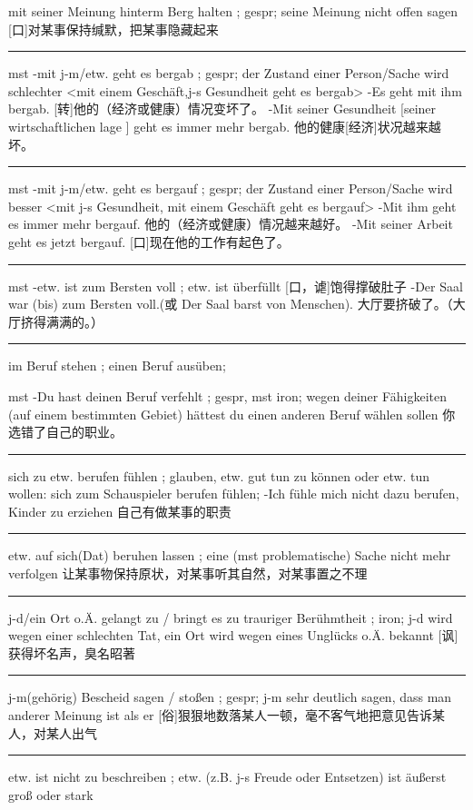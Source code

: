mit seiner Meinung hinterm Berg halten ; gespr; seine Meinung nicht offen sagen
[口]对某事保持缄默，把某事隐藏起来

\noindent\rule{\textwidth}{1pt} 
mst -mit j-m/etw. geht es bergab ; gespr; der Zustand einer Person/Sache wird schlechter \textless mit einem Geschäft,j-s Gesundheit geht es bergab\textgreater 
-Es geht mit ihm bergab. [转]他的（经济或健康）情况变坏了。
-Mit seiner Gesundheit [seiner wirtschaftlichen lage ] geht es immer mehr bergab. 他的健康[经济]状况越来越坏。 

\noindent\rule{\textwidth}{1pt} 
mst -mit j-m/etw. geht es bergauf ; gespr; der Zustand einer Person/Sache wird besser \textless mit j-s Gesundheit, mit einem Geschäft geht es bergauf\textgreater 
-Mit ihm geht es immer mehr bergauf. 他的（经济或健康）情况越来越好。
-Mit seiner Arbeit geht es jetzt bergauf. [口]现在他的工作有起色了。

\noindent\rule{\textwidth}{1pt} 
mst -etw. ist zum Bersten voll ; etw. ist überfüllt 
[口，谑]饱得撑破肚子
-Der Saal war (bis) zum Bersten voll.(或 Der Saal barst von Menschen). 大厅要挤破了。（大厅挤得满满的。）

\noindent\rule{\textwidth}{1pt} 
im Beruf stehen ; einen Beruf ausüben;

mst -Du hast deinen Beruf verfehlt ; gespr, mst iron; wegen deiner Fähigkeiten (auf einem bestimmten Gebiet) hättest du einen anderen Beruf wählen sollen
你选错了自己的职业。

\noindent\rule{\textwidth}{1pt} 
sich zu etw. berufen fühlen ; glauben, etw. gut tun zu können oder etw. tun wollen: sich zum Schauspieler berufen fühlen; -Ich fühle mich nicht dazu berufen, Kinder zu erziehen
自己有做某事的职责

\noindent\rule{\textwidth}{1pt} 
etw. auf sich(Dat) beruhen lassen ; eine (mst problematische) Sache nicht mehr verfolgen
让某事物保持原状，对某事听其自然，对某事置之不理

\noindent\rule{\textwidth}{1pt} 
j-d/ein Ort o.Ä. gelangt zu / bringt es zu trauriger Berühmtheit ; iron; j-d wird wegen einer schlechten Tat, ein Ort wird wegen eines Unglücks o.Ä. bekannt
[讽]获得坏名声，臭名昭著

\noindent\rule{\textwidth}{1pt} 
j-m(gehörig) Bescheid sagen / stoßen ; gespr; j-m sehr deutlich sagen, dass man anderer Meinung ist als er
[俗]狠狠地数落某人一顿，毫不客气地把意见告诉某人，对某人出气

\noindent\rule{\textwidth}{1pt} 
etw. ist nicht zu beschreiben ; etw. (z.B. j-s Freude oder Entsetzen) ist äußerst groß oder stark

